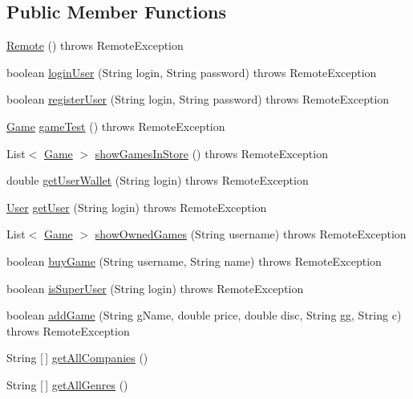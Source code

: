 \subsection*{Public Member Functions}
\begin{DoxyCompactItemize}
\item 
\hyperlink{classes_1_1deusto_1_1server_1_1remote_1_1_remote_a39055ae30196c2afe97a621b80e43374}{Remote} ()  throws Remote\+Exception 
\item 
boolean \hyperlink{classes_1_1deusto_1_1server_1_1remote_1_1_remote_a1c8e0153dd9b3f6d5499eb6d01e48bbe}{login\+User} (String login, String password)  throws Remote\+Exception 
\item 
boolean \hyperlink{classes_1_1deusto_1_1server_1_1remote_1_1_remote_a4b013f75d23e2c9f0dbca2d3bb467f6a}{register\+User} (String login, String password)  throws Remote\+Exception 
\item 
\hyperlink{classes_1_1deusto_1_1server_1_1db_1_1data_1_1_game}{Game} \hyperlink{classes_1_1deusto_1_1server_1_1remote_1_1_remote_a6fb46c2635427f798b75c8ab124b54da}{game\+Test} ()  throws Remote\+Exception
\item 
List$<$ \hyperlink{classes_1_1deusto_1_1server_1_1db_1_1data_1_1_game}{Game} $>$ \hyperlink{classes_1_1deusto_1_1server_1_1remote_1_1_remote_ae40a5882d6b3ef3d5928d87dafeb15fa}{show\+Games\+In\+Store} ()  throws Remote\+Exception 
\item 
double \hyperlink{classes_1_1deusto_1_1server_1_1remote_1_1_remote_af7cc190cccf69cda838a6d9805c5c2f5}{get\+User\+Wallet} (String login)  throws Remote\+Exception
\item 
\hyperlink{classes_1_1deusto_1_1server_1_1db_1_1data_1_1_user}{User} \hyperlink{classes_1_1deusto_1_1server_1_1remote_1_1_remote_a09318956131f355c8b43f93e3c3afea4}{get\+User} (String login)  throws Remote\+Exception
\item 
List$<$ \hyperlink{classes_1_1deusto_1_1server_1_1db_1_1data_1_1_game}{Game} $>$ \hyperlink{classes_1_1deusto_1_1server_1_1remote_1_1_remote_a73569877f9317fc48a4e134977baa304}{show\+Owned\+Games} (String username)  throws Remote\+Exception 
\item 
boolean \hyperlink{classes_1_1deusto_1_1server_1_1remote_1_1_remote_ad9f8ad426b1162504b7b39eb1c86d2a3}{buy\+Game} (String username, String name)  throws Remote\+Exception 
\item 
boolean \hyperlink{classes_1_1deusto_1_1server_1_1remote_1_1_remote_ac7d2e76813b61b5a9fcf33d89b6e08c4}{is\+Super\+User} (String login)  throws Remote\+Exception 
\item 
boolean \hyperlink{classes_1_1deusto_1_1server_1_1remote_1_1_remote_a81c61e602f9419408e0069b51bc1e740}{add\+Game} (String g\+Name, double price, double disc, String gg, String c)  throws Remote\+Exception 
\item 
String \mbox{[}$\,$\mbox{]} \hyperlink{classes_1_1deusto_1_1server_1_1remote_1_1_remote_ab8595d6689604ef57f2d01309936ccd2}{get\+All\+Companies} ()
\item 
String \mbox{[}$\,$\mbox{]} \hyperlink{classes_1_1deusto_1_1server_1_1remote_1_1_remote_a89ce5459e2ebe375dc534e59eda91b74}{get\+All\+Genres} ()
\end{DoxyCompactItemize}
